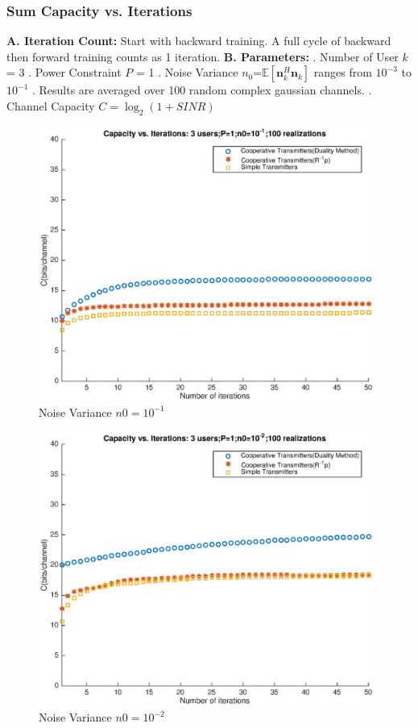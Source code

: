 \documentclass[11pt, oneside]{article}   	%
\begin{document}
\subsubsection{Sum Capacity vs. Iterations}
\textbf{A. Iteration Count:} Start with backward training. A full cycle of backward then forward training counts as 1 iteration.
\newline
\textbf{B. Parameters:}
. Number of User $k$ = 3
. Power Constraint $P$ = 1
. Noise Variance $n_0$=$\mathbb{E}[\textbf{n}_k^{H}\textbf{n}_k]$ ranges from $10^{-3}$ to $10^{-1}$
. Results are averaged over 100 random complex gaussian channels.
. Channel Capacity $C = \log_2 ({1+SINR})$


\begin{figure}[H]
    \centering
    \centerline{\includegraphics[width=110mm]{4}}
    \caption{Noise Variance $n0=10^{-1}$}
\end{figure} 

\begin{figure}[H]
    \centering
    \centerline{\includegraphics[width=110mm]{5}}
    \caption{Noise Variance $n0=10^{-2}$}
\end{figure} 
\end{document}
